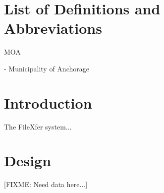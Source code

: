 \documentclass[12pt,letterpaper,dvips]{article}
\newcommand{\FIXME}[1]{\textsf{[FIXME: #1]}}
\newenvironment{itemize*}%
  {\begin{itemize}%
    \setlength{\itemsep}{0pt}%
    \setlength{\parsep}{0pt}}%
  {\end{itemize}}
\begin{document}
\newpage
\tableofcontents

\newpage
\listoffigures
\listoftables


\newpage
\setcounter{secnumdepth}{0}
\section{List of Definitions and Abbreviations}
\begin{itemize*}
  \item{\begin{bf}MOA\end{bf}} - Municipality of Anchorage

\end{itemize*}


\newpage
\setcounter{secnumdepth}{2}
\section{Introduction}
The FileXfer system...


\newpage
\section{Design}
\FIXME{Need data here...}
\end{document}
